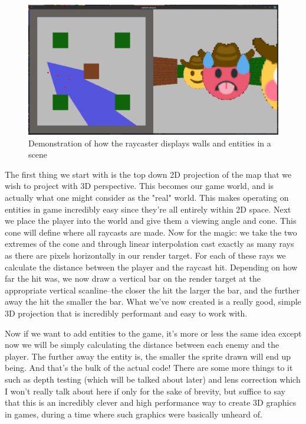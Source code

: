 \documentclass{article}
\begin{document}
\begin{figure}
\centering
\includegraphics[scale=0.3]{raycaster2.png}
\caption{Demonstration of how the raycaster displays walls and entities in a scene}
\end{figure}

The first thing we start with is the top down 2D projection of the map that we
wish to project with 3D perspective. This becomes our game world, and is
actually what one might consider as the "real" world. This makes operating on
entities in game incredibly easy since they're all entirely within 2D space.
Next we place the player into the world and give them a viewing angle and cone.
This cone will define where all raycasts are made. Now for the magic: we take
the two extremes of the cone and through linear interpolation cast exactly as
many rays as there are pixels horizontally in our render target. For each of
these rays we calculate the distance between the player and the raycast hit.
Depending on how far the hit was, we now draw a vertical bar on the render
target at the appropriate vertical scanline--the closer the hit the larger the
bar, and the further away the hit the smaller the bar. What we've now created
is a really good, simple 3D projection that is incredibly performant and easy to
work with.

Now if we want to add entities to the game, it's more or less the same idea
except now we will be simply calculating the distance between each enemy and the
player. The further away the entity is, the smaller the sprite drawn will end up
being. And that's the bulk of the actual code! There are some more things to it
such as depth testing (which will be talked about later) and lens correction
which I won't really talk about here if only for the sake of brevity, but
suffice to say that this is an incredibly clever and high performance way to
create 3D graphics in games, during a time where such graphics were basically
unheard of.
\end{document}
